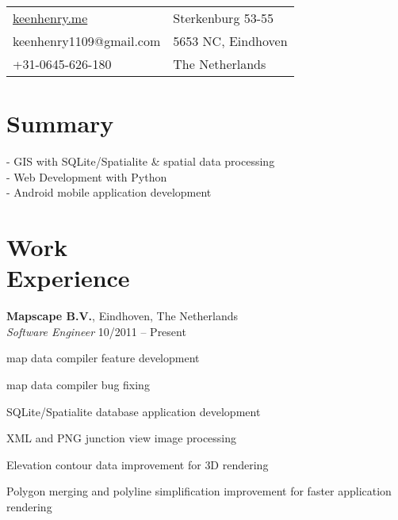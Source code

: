 \documentclass[margin,line]{resume}
\begin{document}
\begin{resume}

      \begin{tabular}{@{}p{6cm}p{8.5cm}}
      \url{keenhenry.me}      & Sterkenburg 53-55 \\
      keenhenry1109@gmail.com & 5653 NC, Eindhoven \\
      +31-0645-626-180        & The Netherlands \\
      \end{tabular}

 
    \section{\mysidestyle Summary}
      - GIS with SQLite/Spatialite \& spatial data processing \\
      - Web Development with Python \\
      - Android mobile application development \\
      
    \section{\mysidestyle Work \\ Experience}

    \textbf{Mapscape B.V.}, Eindhoven, The Netherlands \\
    \textsl{Software Engineer} \hfill 10/2011 -- Present \vspace{-3mm}\\\vspace{-1mm}%
      \begin{list2}
      \item map data compiler feature development
      \item map data compiler bug fixing
      \item SQLite/Spatialite database application development
      \item XML and PNG junction view image processing
      \item Elevation contour data improvement for 3D rendering
      \item Polygon merging and polyline simplification improvement for faster application rendering
      \end{list2}


\end{resume}
\end{document}
